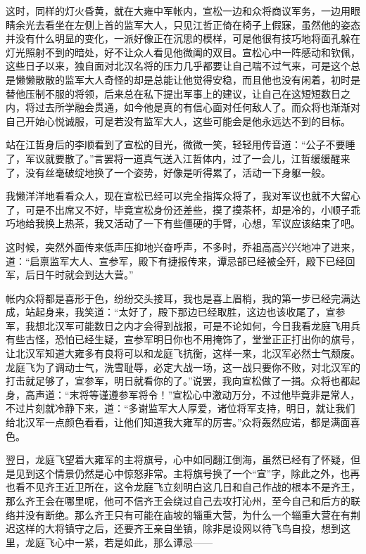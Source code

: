 这时，同样的灯火昏黄，就在大雍中军帐内，宣松一边和众将商议军务，一边用眼睛余光去看坐在左侧上首的监军大人，只见江哲正倚在椅子上假寐，虽然他的姿态并没有什么明显的变化，一派好像正在沉思的模样，可是他很有技巧地将面孔躲在灯光照射不到的暗处，好不让众人看见他微阖的双目。宣松心中一阵感动和钦佩，这些日子以来，独自面对北汉名将的压力几乎都要让自己喘不过气来，可是这个总是懒懒散散的监军大人奇怪的却是总能让他觉得安稳，而且他也没有闲着，初时是替他压制不服的将领，后来总在私下提出军事上的建议，让自己在这短短数日之内，将过去所学融会贯通，如今他是真的有信心面对任何敌人了。而众将也渐渐对自己开始心悦诚服，可是若没有监军大人，这些可能会是他永远达不到的目标。

站在江哲身后的李顺看到了宣松的目光，微微一笑，轻轻用传音道：“公子不要睡了，军议就要散了。”言罢将一道真气送入江哲体内，过了一会儿，江哲缓缓醒来了，没有丝毫破绽地换了一个姿势，好像是听得累了，活动一下身躯一般。

我懒洋洋地看看众人，现在宣松已经可以完全指挥众将了，我对军议也就不大留心了，可是不出席又不好，毕竟宣松身份还差些，摸了摸茶杯，却是冷的，小顺子乖巧地给我换上热茶，我又活动了一下有些僵硬的手臂，心想，军议应该结束了吧。

这时候，突然外面传来低声压抑地兴奋呼声，不多时，乔祖高高兴兴地冲了进来，道：“启禀监军大人、宣参军，殿下有捷报传来，谭忌部已经被全歼，殿下已经回军，后日午时就会到达大营。”

帐内众将都是喜形于色，纷纷交头接耳，我也是喜上眉梢，我的第一步已经完满达成，站起身来，我笑道：“太好了，殿下那边已经取胜，这边也该收尾了，宣参军，我想北汉军可能数日之内才会得到战报，可是不论如何，今日我看龙庭飞用兵有些古怪，恐怕已经生疑，宣参军明日你也不用掩饰了，堂堂正正打出你的旗号，让北汉军知道大雍多有良将可以和龙庭飞抗衡，这样一来，北汉军必然士气颓废。龙庭飞为了调动士气，洗雪耻辱，必定大战一场，这一战只要你不败，对北汉军的打击就足够了，宣参军，明日就看你的了。”说罢，我向宣松做了一揖。众将也都起身，高声道：“末将等谨遵参军将令！”宣松心中激动万分，不过他毕竟非是常人，不过片刻就冷静下来，道：“多谢监军大人厚爱，诸位将军支持，明日，就让我们给北汉军一点颜色看看，让他们知道我大雍军的厉害。”众将轰然应诺，都是满面喜色。

翌日，龙庭飞望着大雍军的主将旗号，心中如同翻江倒海，虽然已经有了怀疑，但是见到这个情景仍然是心中惊怒非常。主将旗号换了一个“宣”字，除此之外，也再也看不见齐王近卫所在，这令龙庭飞立刻明白这几日和自己作战的根本不是齐王，那么齐王会在哪里呢，他可不信齐王会绕过自己去攻打沁州，至今自己和后方的联络并没有断绝。那么齐王只有可能在庙坡的辎重大营，为什么一个辎重大营在有荆迟这样的大将镇守之后，还要齐王亲自坐镇，除非是设网以待飞鸟自投，想到这里，龙庭飞心中一紧，若是如此，那么谭忌——

